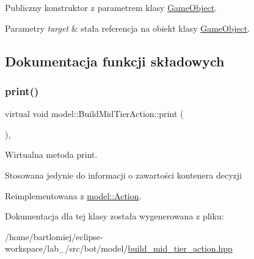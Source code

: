 Publiczny konstruktor z parametrem klasy \hyperlink{classmodel_1_1GameObject}{Game\+Object}. 


\begin{DoxyParams}{Parametry}
{\em target} & stała referencja na obiekt klasy \hyperlink{classmodel_1_1GameObject}{Game\+Object}. \\
\hline
\end{DoxyParams}


\subsection{Dokumentacja funkcji składowych}
\mbox{\label{classmodel_1_1BuildMidTierAction_abec06b6ae68325996228e9b36c9d05d3}} 
\subsubsection{\texorpdfstring{print()}{print()}}
{\footnotesize\ttfamily virtual void model\+::\+Build\+Mid\+Tier\+Action\+::print (\begin{DoxyParamCaption}{ }\end{DoxyParamCaption})\hspace{0.3cm}{\ttfamily [inline]}, {\ttfamily [virtual]}}



Wirtualna metoda print. 

Stosowana jedynie do informacji o zawartości kontenera decyzji 

Reimplementowana z \hyperlink{classmodel_1_1Action_a2955dbb4a69e38a48aa07d730fe2d77c}{model\+::\+Action}.



Dokumentacja dla tej klasy została wygenerowana z pliku\+:\begin{DoxyCompactItemize}
\item 
/home/bartlomiej/eclipse-\/workspace/lab\+\_/src/bot/model/\hyperlink{build__mid__tier__action_8hpp}{build\+\_\+mid\+\_\+tier\+\_\+action.\+hpp}\end{DoxyCompactItemize}

